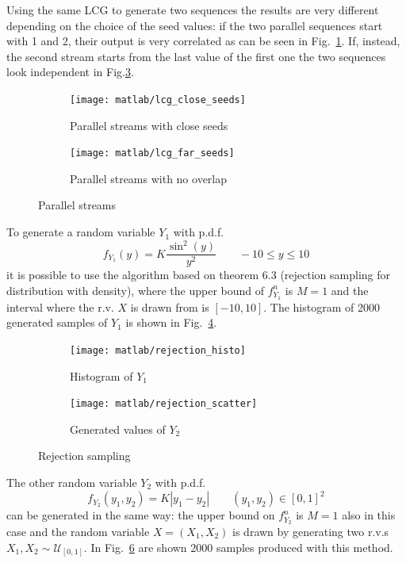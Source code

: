 \documentclass[a4paper,oneside]{article}
\newcommand{\abs}[1]{\left|#1\right|}
\newcommand{\distr}[0]{\sim}
\newcommand{\unif}[1]{\mathcal{U}_{#1}}
\begin{document}
Using the same LCG to generate two sequences the results are very
different depending on the choice of the seed values: if the two
parallel sequences start with 1 and 2, their output is very correlated
as can be seen in Fig.~\ref{plot:lcg_close_seeds}. If, instead, the
second stream starts from the last value of the first one the two
sequences look independent in Fig.\ref{plot:lcg_far_seeds}.
\begin{figure}[htbp]
  \centering
  \begin{subfigure}{0.5\textwidth}
    \centering
    \texttt{[image: matlab/lcg\_close\_seeds]}
    \caption{Parallel streams with close seeds}
    \label{plot:lcg_close_seeds}
  \end{subfigure}%
  \begin{subfigure}{0.5\textwidth}
    \centering
    \texttt{[image: matlab/lcg\_far\_seeds]}
    \caption{Parallel streams with no overlap}
    \label{plot:lcg_far_seeds}
  \end{subfigure}
  \caption{Parallel streams}
\end{figure}

To generate a random variable $Y_1$ with p.d.f.
\[ f_{Y_1}(y) = K\frac{\sin^2(y)}{y^2} \qquad -10 \leq y \leq 10 \]
it is possible to use the algorithm based on theorem 6.3 (rejection
sampling for distribution with density), where the upper bound of
$f_{Y_1}^n$ is $M=1$ and the interval where the r.v. $X$ is drawn from
is $[-10,10]$. The histogram of 2000 generated samples of $Y_1$ is
shown in Fig.~\ref{plot:rejection_histo}.
\begin{figure}[htbp]
  \centering
  \begin{subfigure}{0.5\textwidth}
    \centering
    \texttt{[image: matlab/rejection\_histo]}
    \caption{Histogram of $Y_1$}
    \label{plot:rejection_histo}
  \end{subfigure}%
  \begin{subfigure}{0.5\textwidth}
    \centering
    \texttt{[image: matlab/rejection\_scatter]}
    \caption{Generated values of $Y_2$}
    \label{plot:rejection_scatter}
  \end{subfigure}
  \caption{Rejection sampling}
\end{figure}

The other random variable $Y_2$ with p.d.f.
\[ f_{Y_2}(y_1, y_2) = K\abs{y_1 - y_2} \qquad (y_1, y_2) \in [0, 1]^2 \]
can be generated in the same way: the upper bound on $f_{Y_2}^n$ is
$M=1$ also in this case and the random variable $X = (X_1, X_2)$ is
drawn by generating two r.v.s $X_1, X_2 \distr \unif{[0,1]}$. In
Fig.~\ref{plot:rejection_scatter} are shown 2000 samples produced with
this method.
\end{document}
